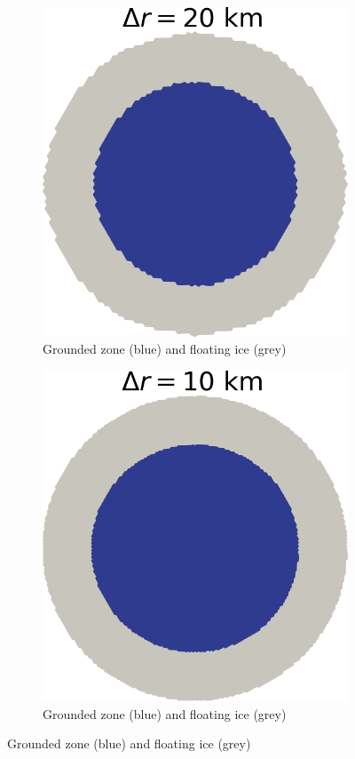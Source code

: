 \documentclass{article}
\begin{document}
\begin{figure}[!h]
\begin{subfigure}{0.25\textwidth}
		\includegraphics[width=\linewidth]{../fig/Grounded_zone_20km_CONE.png}
		\caption{Grounded zone (blue) and floating ice (grey)}
		\label{figCONE20}
	\end{subfigure}\hfil %
	\begin{subfigure}{0.25\textwidth}
		\includegraphics[width=\linewidth]{../fig/Grounded_zone_10km_CONE.png}
		\caption{Grounded zone (blue) and floating ice (grey)}
		\label{figCONE10KM}
	\end{subfigure}
	

\end{figure}
\end{document}
